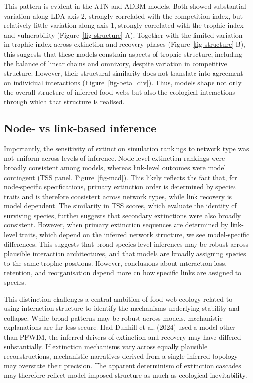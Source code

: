 \documentclass[
]{article}
\begin{document}
This pattern is evident in the ATN and ADBM models. Both showed
substantial variation along LDA axis 2, strongly correlated with the
competition index, but relatively little variation along axis 1,
strongly correlated with the trophic index and vulnerability
(Figure~\ref{fig-structure} A). Together with the limited variation in
trophic index across extinction and recovery phases
(Figure~\ref{fig-structure} B), this suggests that these models
constrain aspects of trophic structure, including the balance of linear
chains and omnivory, despite variation in competitive structure.
However, their structural similarity does not translate into agreement
on individual interactions (Figure~\ref{fig-beta_div}). Thus, models
shape not only the overall structure of inferred food webs but also the
ecological interactions through which that structure is realised.

\subsection{Node- vs link-based
inference}\label{node--vs-link-based-inference}

Importantly, the sensitivity of extinction simulation rankings to
network type was not uniform across levels of inference. Node-level
extinction rankings were broadly consistent among models, whereas
link-level outcomes were model contingent (TSS panel,
Figure~\ref{fig-mad}). This likely reflects the fact that, for
node-specific specifications, primary extinction order is determined by
species traits and is therefore consistent across network types, while
link recovery is model dependent. The similarity in TSS scores, which
evaluate the identity of surviving species, further suggests that
secondary extinctions were also broadly consistent. However, when
primary extinction sequences are determined by link-level traits, which
depend on the inferred network structure, we see model-specific
differences. This suggests that broad species-level inferences may be
robust across plausible interaction architectures, and that models are
broadly assigning species to the same trophic positions. However,
conclusions about interaction loss, retention, and reorganisation depend
more on how specific links are assigned to species.

This distinction challenges a central ambition of food web ecology
related to using interaction structure to identify the mechanisms
underlying stability and collapse. While broad patterns may be robust
across models, mechanistic explanations are far less secure. Had Dunhill
et al. (2024) used a model other than PFWIM, the inferred drivers of
extinction and recovery may have differed substantially. If extinction
mechanisms vary across equally plausible reconstructions, mechanistic
narratives derived from a single inferred topology may overstate their
precision. The apparent determinism of extinction cascades may therefore
reflect model-imposed structure as much as ecological inevitability.
\end{document}

